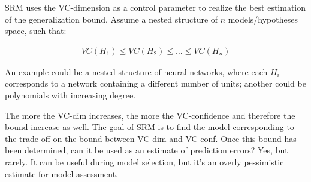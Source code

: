 SRM uses the VC-dimension as a control parameter to realize the best estimation of the generalization bound. Assume a nested structure of $n$ models/hypotheses space, such that: 

\begin{gather*}
    VC(H_1) \leq VC(H_2) \leq \dots \leq VC(H_n)
\end{gather*}

An example could be a nested structure of neural networks, where each $H_i$ corresponds to a network containing a different number of units; another could be polynomials with increasing degree.

The more the VC-dim increases, the more the VC-confidence and therefore the bound increase as well. The goal of SRM is to find the model corresponding to the trade-off on the bound between VC-dim and VC-conf. Once this bound has been determined, can it be used as an estimate of prediction errors? Yes, but rarely. It can be useful during model selection, but it's an overly pessimistic estimate for model assessment.